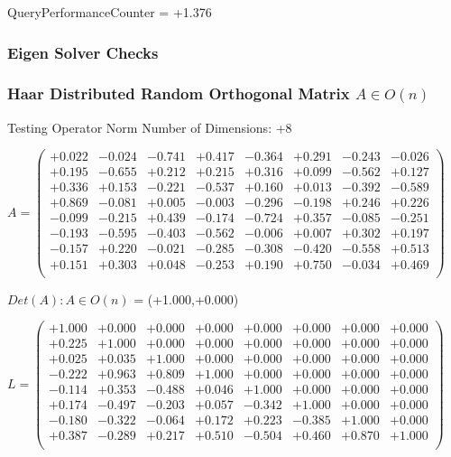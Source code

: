 \documentclass[9pt]{article}
\theoremstyle{plain}
\theoremstyle{definition}
\theoremstyle{remark}
\numberwithin{equation}{section}
\begin{document}
QueryPerformanceCounter  =  +1.376
\subsubsection{Eigen Solver Checks}
\subsubsection{Haar Distributed Random Orthogonal Matrix $A \in O(n)$}
 Testing Operator Norm
Number of Dimensions: +8

$A = \left(
\begin{array}{
cccccccc}
+0.022 & -0.024 & -0.741 & +0.417 & -0.364 & +0.291 & -0.243 & -0.026 \\
+0.195 & -0.655 & +0.212 & +0.215 & +0.316 & +0.099 & -0.562 & +0.127 \\
+0.336 & +0.153 & -0.221 & -0.537 & +0.160 & +0.013 & -0.392 & -0.589 \\
+0.869 & -0.081 & +0.005 & -0.003 & -0.296 & -0.198 & +0.246 & +0.226 \\
-0.099 & -0.215 & +0.439 & -0.174 & -0.724 & +0.357 & -0.085 & -0.251 \\
-0.193 & -0.595 & -0.403 & -0.562 & -0.006 & +0.007 & +0.302 & +0.197 \\
-0.157 & +0.220 & -0.021 & -0.285 & -0.308 & -0.420 & -0.558 & +0.513 \\
+0.151 & +0.303 & +0.048 & -0.253 & +0.190 & +0.750 & -0.034 & +0.469 \\
\end{array}
\right)$ \newline 

$Det(A) :   A \in O(n)$ = (+1.000,+0.000)

$L = \left(
\begin{array}{
cccccccc}
+1.000 & +0.000 & +0.000 & +0.000 & +0.000 & +0.000 & +0.000 & +0.000 \\
+0.225 & +1.000 & +0.000 & +0.000 & +0.000 & +0.000 & +0.000 & +0.000 \\
+0.025 & +0.035 & +1.000 & +0.000 & +0.000 & +0.000 & +0.000 & +0.000 \\
-0.222 & +0.963 & +0.809 & +1.000 & +0.000 & +0.000 & +0.000 & +0.000 \\
-0.114 & +0.353 & -0.488 & +0.046 & +1.000 & +0.000 & +0.000 & +0.000 \\
+0.174 & -0.497 & -0.203 & +0.057 & -0.342 & +1.000 & +0.000 & +0.000 \\
-0.180 & -0.322 & -0.064 & +0.172 & +0.223 & -0.385 & +1.000 & +0.000 \\
+0.387 & -0.289 & +0.217 & +0.510 & -0.504 & +0.460 & +0.870 & +1.000 \\
\end{array}
\right)$ \newline 
\end{document}
